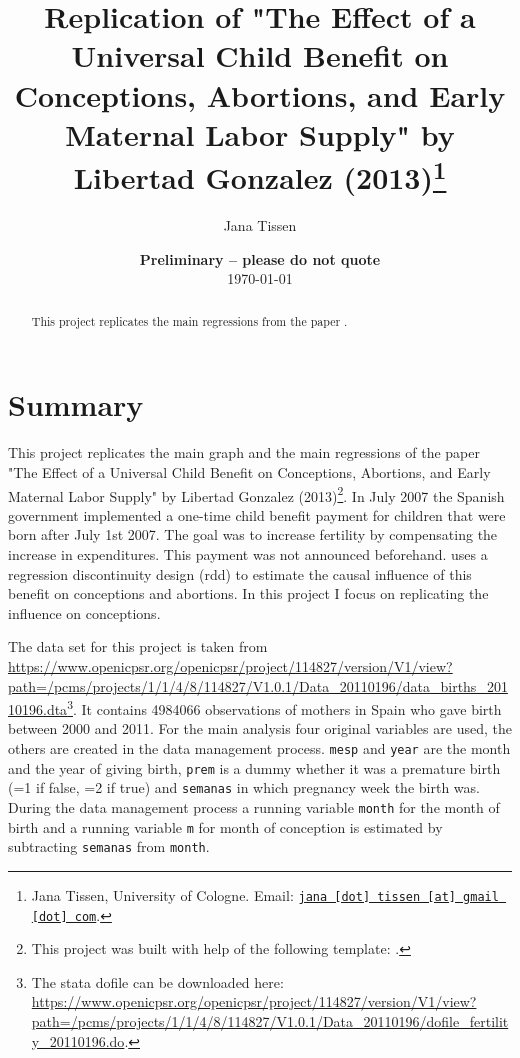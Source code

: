 \documentclass[11pt, a4paper, leqno]{article}
\begin{document}
\title{Replication of "The Effect of a Universal Child Benefit on Conceptions, Abortions, and Early Maternal Labor Supply"
by Libertad Gonzalez (2013)\thanks{Jana Tissen, University of Cologne. Email: \href{mailto:jana.tissen@gmail.com}{\nolinkurl{jana [dot] tissen [at] gmail [dot] com}}.}}

\author{Jana Tissen}

\date{
    {\bf Preliminary -- please do not quote}
    \\[1ex]
    \today
}

\maketitle


\begin{abstract}
This project replicates the main regressions from the paper \citet{gonzalez2013effect}.
\end{abstract}

\clearpage


\section{Summary} %
\label{sec:summary}

This project replicates the main graph and the main regressions of the paper "The Effect of a Universal Child Benefit on Conceptions, Abortions, and Early Maternal Labor Supply"
by Libertad Gonzalez (2013)\footnote{This project was built with help of the following template: \citet{GaudeckerEconProjectTemplates}.}.
In July 2007 the Spanish government implemented a one-time child benefit payment for children that
were born after July 1st 2007. The goal was to increase fertility by compensating the increase in expenditures.
This payment was not announced beforehand. \citet{gonzalez2013effect} uses a regression discontinuity design (rdd) to estimate the causal influence
of this benefit on conceptions and abortions.
In this project I focus on replicating the influence on conceptions.

The data set for this project is taken from
\url{https://www.openicpsr.org/openicpsr/project/114827/version/V1/view?path=/pcms/projects/1/1/4/8/114827/V1.0.1/Data_20110196/data_births_20110196.dta}\footnote{The stata dofile can be downloaded here:
\url{https://www.openicpsr.org/openicpsr/project/114827/version/V1/view?path=/pcms/projects/1/1/4/8/114827/V1.0.1/Data_20110196/dofile_fertility_20110196.do}.}.
It contains 4984066 observations of mothers in Spain who gave birth between 2000 and 2011.
For the main analysis four original variables are used, the others are created in the data management process.
\texttt{mesp} and \texttt{year} are the month and the year of giving birth, \texttt{prem} is a dummy whether it was a premature
birth (=1 if false, =2 if true) and \texttt{semanas} in which pregnancy week the birth was.
During the data management process a running variable \texttt{month} for the month of birth and a running variable \texttt{m}
for month of conception is estimated by subtracting \texttt{semanas} from \texttt{month}.
\end{document}
